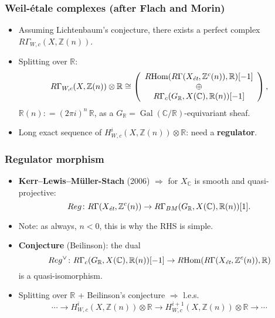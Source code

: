 \documentclass[handout]{beamer}
\newcommand{\ZZ}{\mathbb{Z}}
\newcommand{\RR}{\mathbb{R}}
\newcommand{\CC}{\mathbb{C}}
\newcommand{\isom}{\cong}
\DeclareMathOperator{\Gal}{Gal}
\newcommand{\dfn}{\mathrel{\mathop:}=}
\DeclareMathOperator{\Hom}{Hom}
\newcommand{\term}{\textbf}
\begin{document}
\begin{frame}
  \frametitle{Weil-étale complexes (after Flach and Morin)}

  \begin{itemize}
  \item<2-> Assuming Lichtenbaum's conjecture, there exists a perfect complex
    $R\Gamma_{W,c} (X, \ZZ (n))$.

  \item<3-> Splitting over $\RR$:
    \[ R\Gamma_{W,c} (X, \ZZ (n)) \otimes \RR \isom
      \left(\begin{array}{c}
              R\!\Hom (R\Gamma (X_\text{\it ét}, \ZZ^c (n)), \RR) [-1] \\
              \oplus \\
              R\Gamma_c (G_\RR, X (\CC), \RR (n)) [-1]
            \end{array}\right), \]
    $\RR (n) \dfn (2\pi i)^n\,\RR$, as a $G_\RR = \Gal (\CC/\RR)$-equivariant sheaf.

  \item<4-> Long exact sequence of $H^i_{W,c} (X, \ZZ (n)) \otimes \RR$: need a
    \term{regulator}.
  \end{itemize}
\end{frame}


\begin{frame}
  \frametitle{Regulator morphism}

  \begin{itemize}
  \item<2-> \textbf{Kerr--Lewis--Müller-Stach} (2006) $\Longrightarrow$ for
    $X_\CC$ is smooth and quasi-projective:
    $$Reg\colon R\Gamma (X_\text{\it ét}, \ZZ^c (n)) \to R\Gamma_{BM} (G_\RR, X (\CC), \RR (n)) [1].$$

  \item<3-> Note: as always, $n < 0$, this is why the RHS is simple.

  \item<4-> \textbf{Conjecture} (Beilinson): the dual
    $$Reg^\vee\colon R\Gamma_c (G_\RR, X (\CC), \RR (n)) [-1] \to R\!\Hom (R\Gamma (X_\text{\it ét}, \ZZ^c (n)), \RR)$$
    is a quasi-isomorphism.

  \item<5-> Splitting over $\RR$ + Beilinson's conjecture $\Longrightarrow$
    l.e.s.
    $$\cdots \to H_{W,c}^i (X, \ZZ (n)) \otimes \RR \to H_{W,c}^{i+1} (X, \ZZ (n)) \otimes \RR \to \cdots$$
  \end{itemize}
\end{frame}
\end{document}
